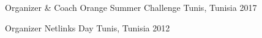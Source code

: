 

\begin{cvhonors}

	\cvhonor
		{Organizer \& Coach} %
		{Orange Summer Challenge} %
		{Tunis, Tunisia} %
		{2017} %

  \cvhonor
    {Organizer} %
    {Netlinks Day} %
    {Tunis, Tunisia} %
    {2012} %

\end{cvhonors}
